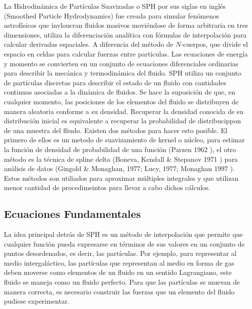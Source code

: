 \documentclass[a4paper,openright,12pt]{book}
\begin{document}
La Hidrodinámica de Partículas Suavizadas o SPH por sus siglas en inglés (Smoothed Particle Hydrodynamics) fue creada para simular fenómenos astrofísicos que invloucran fluidos masivos moviéndose de forma arbitraria en tres dimensiones, utiliza la diferenciación analítica con fórmulas de interpolación para calcular derivadas espaciales. A diferencia del método de $N$-cuerpos, que divide el espacio en celdas para calcular fuerzas entre partículas. Las ecuaciones de energía y momento se convierten en un conjunto de ecuaciones diferenciales ordinarias para describir la mecánica y termodinámica del fluido. SPH utiliza un conjunto de partículas discretas para describir el estado de un fluido con cantidades continuas asociadas a la dinámica de fluidos. Se hace la suposición de que, en cualquier momento, las posiciones de los elementos del fluido se  distribuyen de manera aleatoria conforme a su densidad. Recuperar la densidad conocida de su distribución inicial es equivalente a recuperar la probabilidad de distribucippon de una muestra del fliudo. Existen dos métodos para hacer esto posible. El primero de ellos es un metodo de suavizamiento de kernel o núcleo, para estimar la función de densidad de probabilidad de una función (Parzen 1962 \cite{b5.3}), el otro método es la técnica de spline delta (Boneva, Kendall \& Stepanov 1971 \cite{b5.4}) para análisis de datos (Gingold \& Monaghan, 1977; Lucy, 1977; Monaghan 1997 \cite{b6,b7}). Estos métodos son utiliados para aproximar múltiples integrales y que utilizan menor cantidad de procedimeintos para llevar a cabo dichos cálculos.

\subsection{Ecuaciones Fundamentales}
La idea principal detrás de SPH es un método de interpolación que permite que cualquier función pueda expresarse en términos de sus valores en un conjunto de puntos desordenados, es decir, las partículas. Por ejemplo, para representar al medio intergaláctico, las partículas que representan al medio en forma de gas deben moverse como elementos de un fluido en un sentido Lagrangiano, este fluido se maneja como un fluido perfecto. Para que las partículas se muevan de manera correcta, es necesario construir las fuerzas que un elemento del fluido pudiese experimentar. 
\end{document}
